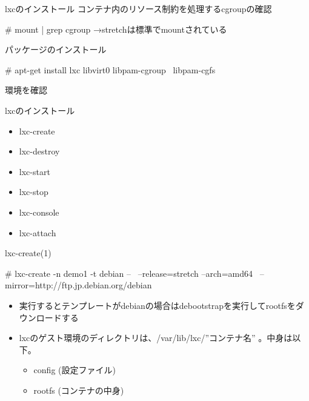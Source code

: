 \begin{frame}[containsverbatim]{lxcのインストール}
  コンテナ内のリソース制約を処理するcgroupの確認
  \begin{commandline}
    # mount | grep cgroup
    →stretchは標準でmountされている
  \end{commandline}
  パッケージのインストール
  \begin{commandline}
    # apt-get install lxc libvirt0 libpam-cgroup \
    libpam-cgfs
  \end{commandline}
  環境を確認
\end{frame}

\begin{frame}[containsverbatim]{lxcのインストール}
  \begin{itemize}
  \item lxc-create
  \item lxc-destroy
  \item lxc-start
  \item lxc-stop
  \item lxc-console
  \item lxc-attach
  \end{itemize}
\end{frame}



\begin{frame}[containsverbatim]{lxc-create(1)}
  \begin{commandline}
    # lxc-create -n demo1 -t debian -- \
    --release=stretch --arch=amd64 \
    --mirror=http://ftp.jp.debian.org/debian
  \end{commandline}   
  \begin{itemize}
  \item 実行するとテンプレートがdebianの場合はdebootstrapを実行してrootfsをダウンロードする
  \item lxcのゲスト環境のディレクトリは、/var/lib/lxc/''コンテナ名'' 。中身は以下。
    \begin{itemize}
    \item config (設定ファイル)
    \item rootfs (コンテナの中身)
    \end{itemize}
  \end{itemize}
\end{frame}

